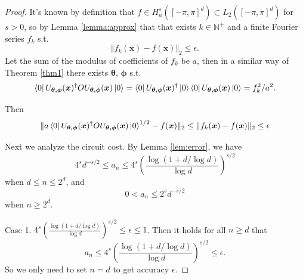 \documentclass{article}
\theoremstyle{plain}
\theoremstyle{definition}
\theoremstyle{remark}
\begin{document}
\thmtwo*
\begin{proof}
    It's known by definition that $f\in H^s_u([-\pi,\pi]^d)\subset L_2([-\pi,\pi]^d)$ for $s>0$, 
    so by Lemma \ref{lemma:approx} that that exists $k\in \mathbb{N}^+$ and a finite Fourier series $f_k$ s.t.
    \begin{equation*}
        \Vert f_k(\boldsymbol{x}) - f(\boldsymbol{x})\Vert_2 \leq \epsilon.
    \end{equation*}
    Let the sum of the modulus of coefficients of $f_k$ be $a$, then in a similar way of Theorem \ref{thm1} there exists $\boldsymbol{\theta}$, $\boldsymbol{\phi}$ s.t.
    \begin{equation*}
        \bra{0}
        U_{\boldsymbol{\theta,\phi}}(\boldsymbol{x})^\dagger
        O
        U_{\boldsymbol{\theta,\phi}}(\boldsymbol{x})
        \ket{0}
        =
        \bra{0}
        U_{\boldsymbol{\theta,\phi}}(\boldsymbol{x})^\dagger
        \ket{0}
        \bra{0}
        U_{\boldsymbol{\theta,\phi}}(\boldsymbol{x})
        \ket{0}
        =
        f_k^2/a^2.
    \end{equation*}
   
   Then
   \begin{equation*}
       \Vert a\bra{0}U_{\boldsymbol{\theta,\phi}}(\boldsymbol{x})^\dagger O U_{\boldsymbol{\theta,\phi}}(\boldsymbol{x})\ket{0}^{1/2} 
        -
        f(\boldsymbol{x})
        \Vert_{2}
        \leq
        \Vert f_k(\boldsymbol{x}) 
        -
        f(\boldsymbol{x})
        \Vert_{2}
        \leq
        \epsilon
   \end{equation*}
   
   
   Next we analyze the circuit cost. By Lemma \ref{lem:error}, we have 
    \begin{equation}
        4^s d^{-s/2} \leq a_n \leq 4^s \left(\frac{\log (1+d/\log d)}{\log d}\right)^{s/2}
    \end{equation}
    when $d \leq n \leq 2^d$, and
    \begin{equation*}
        0 < a_n \leq 2^s d^{-s/2}
    \end{equation*}
    when $n \geq 2^d$.

    Case 1. $4^s \left(\frac{\log (1+d/\log d)}{\log d}\right)^{s/2} \leq \epsilon \leq 1$. Then it holds for all $n\geq d$ that
    \begin{equation*}
        a_n \leq 4^s \left(\frac{\log (1+d/\log d)}{\log d}\right)^{s/2} \leq \epsilon.
    \end{equation*}
    So we only need to set $n=d$ to get accuracy $\epsilon$.


\end{proof}
\end{document}
